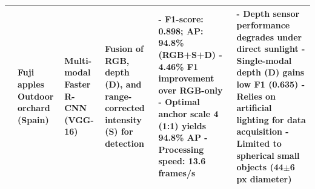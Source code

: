 \documentclass[a4paper,fleqn]{cas-dc}
\begin{document}
\begin{table}[htbp]
\begin{tabular}{@{}p{}p{}p{}p{}p{}p{}@{}}
	\cite{gene2019multi} \newline 2019 & Fuji apples \newline Outdoor orchard (Spain) & Multi-modal Faster R-CNN (VGG-16) & Fusion of RGB, depth (D), and range-corrected intensity (S) for detection & - F1-score: 0.898; AP: 94.8\% (RGB+S+D) \newline - 4.46\% F1 improvement over RGB-only \newline - Optimal anchor scale 4 (1:1) yields 94.8\% AP \newline - Processing speed: 13.6 frames/s & - Depth sensor performance degrades under direct sunlight \newline - Single-modal depth (D) gains low F1 (0.635) \newline - Relies on artificial lighting for data acquisition \newline - Limited to spherical small objects (44$\pm$6 px diameter) \\ \midrule
	

\end{tabular}
\end{table}
\end{document}
